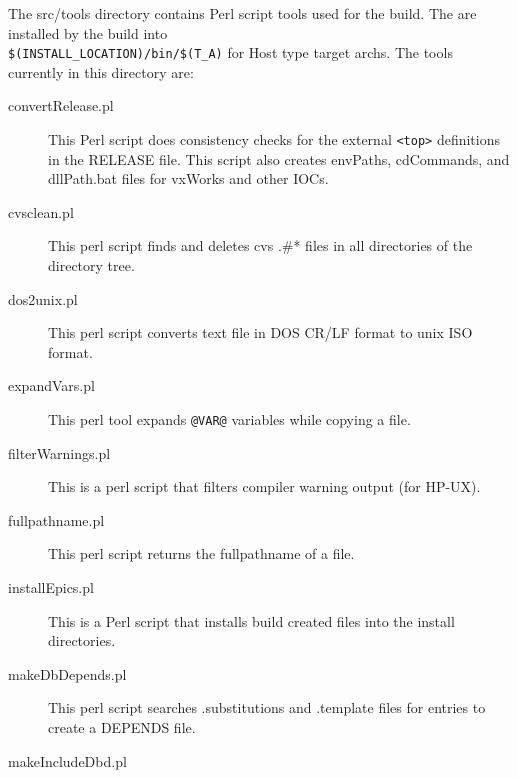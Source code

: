 The src/tools directory contains Perl script tools used for the build. The are installed by the build into \\
\verb|$(INSTALL_LOCATION)/bin/$(T_A)| for Host type target archs. The tools currently in this directory are:

\begin{description}

\item[convertRelease.pl]

This Perl script does consistency checks for the external \verb|<top>| definitions in the RELEASE file. This script also creates envPaths, cdCommands, and dllPath.bat files for vxWorks and other IOCs.

\item[cvsclean.pl]

This perl script finds and deletes cvs .\#* files in all directories of the directory tree.

\item[dos2unix.pl]

This perl script converts text file in DOS CR/LF format to unix ISO format.

\item[expandVars.pl]

This perl tool expands \verb|@VAR@| variables while copying a file.

\item[filterWarnings.pl]

This is a perl script that filters compiler warning output (for HP-UX).

\item[fullpathname.pl]

This perl script returns the fullpathname of a file.

\item[installEpics.pl]

This is a Perl script that installs build created files into the install directories.

\item[makeDbDepends.pl]

This perl script searches .substitutions and .template files for entries to create a DEPENDS file.

\item[makeIncludeDbd.pl]


\end{description}
